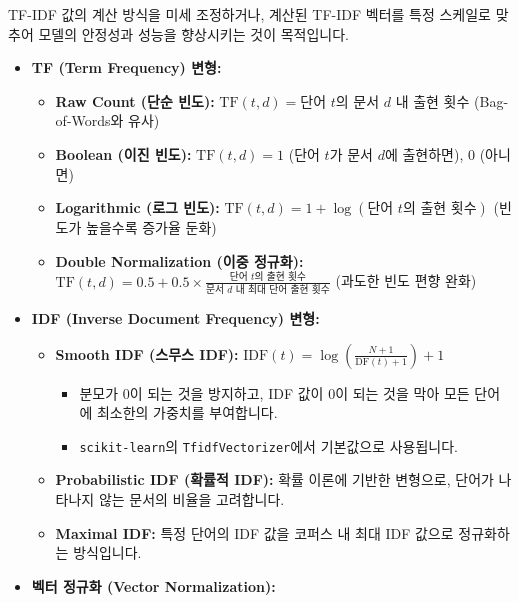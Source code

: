 \documentclass[11pt,a4paper]{article}
\theoremstyle{definition}
\begin{document}
\begin{tcolorbox}[summarybox, title=TF-IDF 변형 및 정규화의 목적]
TF-IDF 값의 계산 방식을 미세 조정하거나, 계산된 TF-IDF 벡터를 특정 스케일로 맞추어 모델의 안정성과 성능을 향상시키는 것이 목적입니다.
\end{tcolorbox}

\begin{itemize}
    \item \textbf{TF (Term Frequency) 변형:}
    \begin{itemize}
        \item \textbf{Raw Count (단순 빈도):} $\text{TF}(t, d) = \text{단어 } t \text{의 문서 } d \text{ 내 출현 횟수}$ (Bag-of-Words와 유사)
        \item \textbf{Boolean (이진 빈도):} $\text{TF}(t, d) = 1$ (단어 $t$가 문서 $d$에 출현하면), $0$ (아니면)
        \item \textbf{Logarithmic (로그 빈도):} $\text{TF}(t, d) = 1 + \log(\text{단어 } t \text{의 출현 횟수})$ (빈도가 높을수록 증가율 둔화)
        \item \textbf{Double Normalization (이중 정규화):} $\text{TF}(t, d) = 0.5 + 0.5 \times \frac{\text{단어 } t \text{의 출현 횟수}}{\text{문서 } d \text{ 내 최대 단어 출현 횟수}}$ (과도한 빈도 편향 완화)
    \end{itemize}
    \item \textbf{IDF (Inverse Document Frequency) 변형:}
    \begin{itemize}
        \item \textbf{Smooth IDF (스무스 IDF):} $\text{IDF}(t) = \log \left( \frac{N + 1}{\text{DF}(t) + 1} \right) + 1$
            \begin{itemize}
                \item 분모가 0이 되는 것을 방지하고, IDF 값이 0이 되는 것을 막아 모든 단어에 최소한의 가중치를 부여합니다.
                \item \texttt{scikit-learn}의 \texttt{TfidfVectorizer}에서 기본값으로 사용됩니다.
            \end{itemize}
        \item \textbf{Probabilistic IDF (확률적 IDF):} 확률 이론에 기반한 변형으로, 단어가 나타나지 않는 문서의 비율을 고려합니다.
        \item \textbf{Maximal IDF:} 특정 단어의 IDF 값을 코퍼스 내 최대 IDF 값으로 정규화하는 방식입니다.
    \end{itemize}
    \item \textbf{벡터 정규화 (Vector Normalization):}
    \begin{itemize}

\end{itemize}
\end{itemize}
\end{document}
